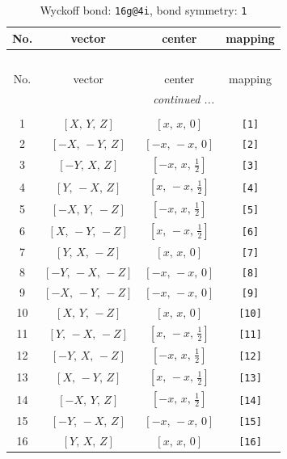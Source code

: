 \documentclass[fleqn,8pt]{jsarticle}
\begin{document}
\begin{longtable}{cccc}
\caption{Wyckoff bond: {\tt 16g@4i}, bond symmetry: {\tt 1}}
 \\
 \hline \hline
No. & vector & center & mapping \\ \hline \endfirsthead

\multicolumn{3}{l}{\tablename\ \thetable{}} \\
 \hline \hline
No. & vector & center & mapping \\ \hline \endhead

 \hline \hline
\multicolumn{3}{r}{\footnotesize\it continued ...} \\ \endfoot

 \hline \hline
\multicolumn{3}{r}{} \\ \endlastfoot

1 & $\left[ X,\, Y,\, Z \right]$ & $\left[ x,\, x,\, 0 \right]$ & {\tt [1]} \\ \hline
2 & $\left[ - X,\, - Y,\, Z \right]$ & $\left[ - x,\, - x,\, 0 \right]$ & {\tt [2]} \\ \hline
3 & $\left[ - Y,\, X,\, Z \right]$ & $\left[ - x,\, x,\, \frac{1}{2} \right]$ & {\tt [3]} \\ \hline
4 & $\left[ Y,\, - X,\, Z \right]$ & $\left[ x,\, - x,\, \frac{1}{2} \right]$ & {\tt [4]} \\ \hline
5 & $\left[ - X,\, Y,\, - Z \right]$ & $\left[ - x,\, x,\, \frac{1}{2} \right]$ & {\tt [5]} \\ \hline
6 & $\left[ X,\, - Y,\, - Z \right]$ & $\left[ x,\, - x,\, \frac{1}{2} \right]$ & {\tt [6]} \\ \hline
7 & $\left[ Y,\, X,\, - Z \right]$ & $\left[ x,\, x,\, 0 \right]$ & {\tt [7]} \\ \hline
8 & $\left[ - Y,\, - X,\, - Z \right]$ & $\left[ - x,\, - x,\, 0 \right]$ & {\tt [8]} \\ \hline
9 & $\left[ - X,\, - Y,\, - Z \right]$ & $\left[ - x,\, - x,\, 0 \right]$ & {\tt [9]} \\ \hline
10 & $\left[ X,\, Y,\, - Z \right]$ & $\left[ x,\, x,\, 0 \right]$ & {\tt [10]} \\ \hline
11 & $\left[ Y,\, - X,\, - Z \right]$ & $\left[ x,\, - x,\, \frac{1}{2} \right]$ & {\tt [11]} \\ \hline
12 & $\left[ - Y,\, X,\, - Z \right]$ & $\left[ - x,\, x,\, \frac{1}{2} \right]$ & {\tt [12]} \\ \hline
13 & $\left[ X,\, - Y,\, Z \right]$ & $\left[ x,\, - x,\, \frac{1}{2} \right]$ & {\tt [13]} \\ \hline
14 & $\left[ - X,\, Y,\, Z \right]$ & $\left[ - x,\, x,\, \frac{1}{2} \right]$ & {\tt [14]} \\ \hline
15 & $\left[ - Y,\, - X,\, Z \right]$ & $\left[ - x,\, - x,\, 0 \right]$ & {\tt [15]} \\ \hline
16 & $\left[ Y,\, X,\, Z \right]$ & $\left[ x,\, x,\, 0 \right]$ & {\tt [16]} \\
\end{longtable}
\end{document}
